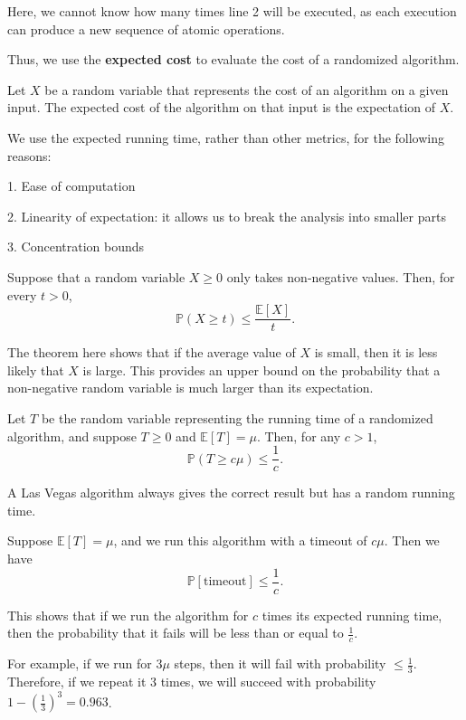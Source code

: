 Here, we cannot know how many times line 2 will be executed, as each execution can produce a new sequence of atomic operations.

Thus, we use the \textbf{expected cost} to evaluate the cost of a randomized algorithm. 

\begin{definition}
  Let \(X\) be a random variable that represents the cost of an algorithm on a given input. The expected cost of the algorithm on that input is the expectation of \(X\). 
\end{definition}

We use the expected running time, rather than other metrics, for the following reasons: 

1. Ease of computation

2. Linearity of expectation: it allows us to break the analysis into smaller parts

3. Concentration bounds

\begin{theorem}
  Suppose that a random variable \(X \geq 0\) only takes non-negative values. Then, for every \(t > 0\),
  \[
      \mathbb{P}(X \geq t) \leq \dfrac{\mathbb{E}[X]}{t}.
  \]
\end{theorem}

The theorem here shows that if the average value of \(X\) is small, then it is less likely that \(X\) is large. This provides an upper bound on the probability that a non-negative random variable is much larger than its expectation. 

Let \(T\) be the random variable representing the running time of a randomized algorithm, and suppose \(T \geq 0\) and \(\mathbb{E}[T] = \mu\). Then, for any \(c > 1\),
\[
    \mathbb{P}(T \geq c \mu) \leq \dfrac{1}{c}.
\]

\begin{eg}
  A Las Vegas algorithm always gives the correct result but has a random running time.

  Suppose \(\mathbb{E}[T] = \mu\), and we run this algorithm with a timeout of \(c \mu\). Then we have 
  \[
    \mathbb{P}[\text{timeout}] \leq \dfrac{1}{c}.
  \]

  This shows that if we run the algorithm for \(c\) times its expected running time, then the probability that it fails will be less than or equal to \(\frac{1}{c}\). 

  For example, if we run for \(3\mu\) steps, then it will fail with probability \(\leq \frac{1}{3}\). Therefore, if we repeat it 3 times, we will succeed with probability \(1 - \left(\frac{1}{3}\right)^3 = 0.963\).
\end{eg}

